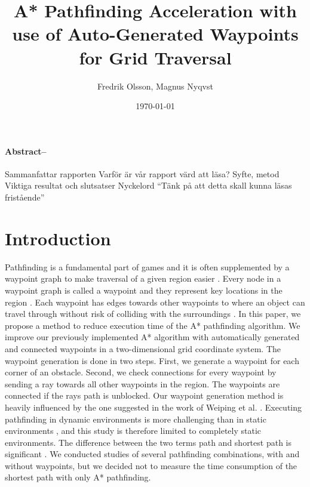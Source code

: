 \documentclass[a4paper]{article}
\title{\Huge A* Pathfinding Acceleration with use of Auto-Generated Waypoints for Grid Traversal}
\author{Fredrik Olsson, Magnus Nyqvst}
\date{\today}
\begin{document}
\maketitle
\newpage
\thispagestyle{empty}
\paragraph{Abstract--}
Sammanfattar rapporten
Varför är vår rapport värd att läsa?
Syfte, metod
Viktiga resultat och slutsatser Nyckelord
“Tänk på att detta skall kunna läsas fristående”

\tableofcontents
\listoffigures
\newpage
{}
\twocolumn
\section{Introduction}
Pathfinding is a fundamental part of games \cite{dynaPF15}\cite{roboGame15} and it is often supplemented by a waypoint graph to make traversal of a given region easier \cite{dynaPF15}. Every node in a waypoint graph is called a waypoint and they represent key locations in the region \cite{dynaPF15}. Each waypoint has edges towards other waypoints to where an object can travel through without risk of colliding with the surroundings \cite{dynaPF15}.\newline
In this paper, we propose a method to reduce execution time of the A* pathfinding algorithm. We improve our previously implemented A* algorithm with automatically generated and connected waypoints in a two-dimensional grid coordinate system. The waypoint generation is done in two steps. First, we generate a waypoint for each corner of an obstacle. Second, we check connections for every waypoint by sending a ray towards all other waypoints in the region. The waypoints are connected if the rays path is unblocked. Our waypoint generation method is heavily influenced by the one suggested in the work of Weiping et al. \cite{dynaPF15}.\newline
Executing pathfinding in dynamic environments is more challenging than in static environments \cite{dynaPF15}, and this study is therefore limited to completely static environments. The difference between the two terms path and shortest path is significant \cite{heuristicGame15}. We conducted studies of several pathfinding combinations, with and without waypoints, but we decided not to measure the time consumption of the shortest path with only A* pathfinding.
\end{document}
